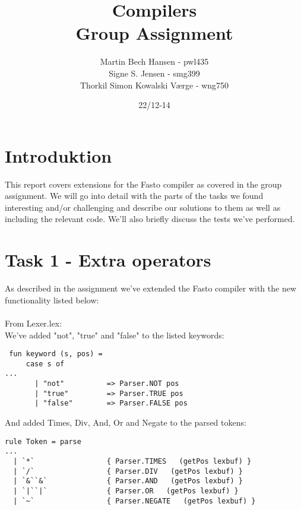 \documentclass{article}
\begin{document}

\title{Compilers\\Group Assignment}
\author{Martin Bech Hansen - pwl435\\Signe S. Jensen - smg399\\Thorkil Simon Kowalski Værge - wng750}

\date{22/12-14}

\maketitle
\newpage

\tableofcontents

\newpage

\section{Introduktion}
This report covers extensions for the Fasto compiler as covered in the group assignment. We will go into detail with the parts of the tasks we found interesting and/or challenging and describe our solutions to them as well as including the relevant code. We'll also briefly discuss the tests we've performed.

\section{Task 1 - Extra operators}

As described in the assignment we've extended the Fasto compiler with the new functionality listed below:\\
\\
From Lexer.lex:\\
We've added "not", "true" and "false" to the listed keywords:
\begin{lstlisting}
 fun keyword (s, pos) =
     case s of
...
       | "not"          => Parser.NOT pos
       | "true"         => Parser.TRUE pos
       | "false"        => Parser.FALSE pos       
\end{lstlisting}
\noindent And added Times, Div, And, Or and Negate to the parsed tokens:
\begin{lstlisting}
rule Token = parse
...
  | `*`                 { Parser.TIMES   (getPos lexbuf) }
  | `/`                 { Parser.DIV   (getPos lexbuf) }
  | `&``&`              { Parser.AND   (getPos lexbuf) }
  | `|``|`              { Parser.OR   (getPos lexbuf) }
  | `~`                 { Parser.NEGATE   (getPos lexbuf) }
\end{lstlisting}
\end{document}
